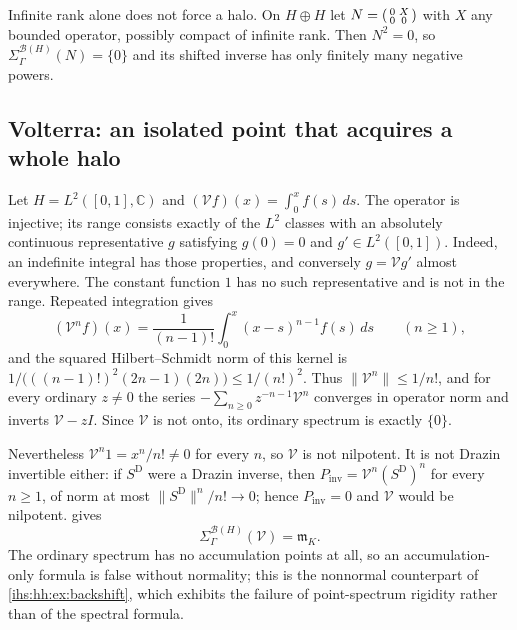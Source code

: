 \documentclass[11pt,a4paper]{article}
\numberwithin{equation}{section}
\theoremstyle{definition}
\theoremstyle{remark}
\newcommand{\C}{\mathbb C}
\newcommand{\mK}{\mathfrak m_K}
\newcommand{\B}{\mathcal B(H)}
\newcommand{\norm}[1]{\lVert#1\rVert}
\begin{document}
Infinite rank alone does not force a halo. On $H\oplus H$ let
$N=\begin{psmallmatrix}0&X\\0&0\end{psmallmatrix}$ with $X$ any bounded
operator, possibly compact of infinite rank. Then $N^2=0$, so
$\Sigma^{\B}_\Gamma(N)=\{0\}$ and its shifted inverse has only finitely many
negative powers.

\subsection{Volterra: an isolated point that acquires a whole halo}\label{ihs:dz:sec:volterra}
Let $H=L^2([0,1],\C)$ and $(\mathcal Vf)(x)=\int_0^xf(s)\,ds$. The operator is
injective; its range consists exactly of the $L^2$ classes with an absolutely
continuous representative $g$ satisfying $g(0)=0$ and $g'\in L^2([0,1])$.
Indeed, an indefinite integral has those properties, and conversely
$g=\mathcal Vg'$ almost everywhere. The constant function $1$ has no such
representative and is not in the range. Repeated integration gives
\begin{equation}\label{ihs:dz:eq:volterra}
 (\mathcal V^nf)(x)=\frac1{(n-1)!}\int_0^x(x-s)^{n-1}f(s)\,ds\qquad(n\ge1),
\end{equation}
and the squared Hilbert--Schmidt norm of this kernel is
$1/\bigl(((n-1)!)^2(2n-1)(2n)\bigr)\le1/(n!)^2$. Thus
$\norm{\mathcal V^n}\le1/n!$, and for every ordinary $z\ne0$ the series
$-\sum_{n\ge0}z^{-n-1}\mathcal V^n$ converges in operator norm and inverts
$\mathcal V-zI$. Since $\mathcal V$ is not onto, its ordinary spectrum is
exactly $\{0\}$.

Nevertheless $\mathcal V^n1=x^n/n!\ne0$ for every $n$, so $\mathcal V$ is not
nilpotent. It is not Drazin invertible either: if $S^{\mathrm D}$ were a
Drazin inverse, then $P_{\mathrm{inv}}=\mathcal V^n(S^{\mathrm D})^n$ for
every $n\ge1$, of norm at most $\norm{S^{\mathrm D}}^n/n!\to0$; hence
$P_{\mathrm{inv}}=0$ and $\mathcal V$ would be nilpotent. 
gives
\begin{equation}\label{ihs:dz:eq:volterrahalo}
 \Sigma^{\B}_\Gamma(\mathcal V)=\mK.
\end{equation}
The ordinary spectrum has no accumulation points at all, so an
accumulation-only formula is false without normality; this is the
nonnormal counterpart of \cref{ihs:hh:ex:backshift}, which exhibits the
failure of point-spectrum rigidity rather than of the spectral formula.
\end{document}

